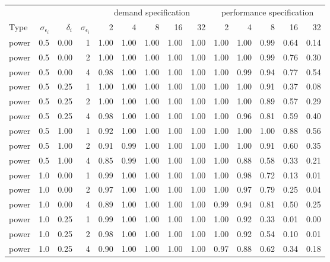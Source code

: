 \begin{table}[H]
\centering\begingroup\fontsize{8}{10}\selectfont

\begin{tabular}{lrrrrrrrrrrrrr}
\toprule
\multicolumn{4}{c}{ } & \multicolumn{5}{c}{demand specification} & \multicolumn{5}{c}{performance specification} \\
\cmidrule(l{3pt}r{3pt}){5-9} \cmidrule(l{3pt}r{3pt}){10-14}
Type & $\sigma_{\epsilon_i}$ & $\delta_i$ & $\sigma_{\epsilon_i}$ & 2 & 4 & 8 & 16 & 32 & 2 & 4 & 8 & 16 & 32\\
\midrule
power & 0.5 & 0.00 & 1 & 1.00 & 1.00 & 1.00 & 1.00 & 1.00 & 1.00 & 1.00 & 0.99 & 0.64 & 0.14\\
power & 0.5 & 0.00 & 2 & 1.00 & 1.00 & 1.00 & 1.00 & 1.00 & 1.00 & 1.00 & 0.99 & 0.76 & 0.30\\
power & 0.5 & 0.00 & 4 & 0.98 & 1.00 & 1.00 & 1.00 & 1.00 & 1.00 & 0.99 & 0.94 & 0.77 & 0.54\\
power & 0.5 & 0.25 & 1 & 1.00 & 1.00 & 1.00 & 1.00 & 1.00 & 1.00 & 1.00 & 0.91 & 0.37 & 0.08\\
power & 0.5 & 0.25 & 2 & 1.00 & 1.00 & 1.00 & 1.00 & 1.00 & 1.00 & 1.00 & 0.89 & 0.57 & 0.29\\
power & 0.5 & 0.25 & 4 & 0.98 & 1.00 & 1.00 & 1.00 & 1.00 & 1.00 & 0.96 & 0.81 & 0.59 & 0.40\\
power & 0.5 & 1.00 & 1 & 0.92 & 1.00 & 1.00 & 1.00 & 1.00 & 1.00 & 1.00 & 1.00 & 0.88 & 0.56\\
power & 0.5 & 1.00 & 2 & 0.91 & 0.99 & 1.00 & 1.00 & 1.00 & 1.00 & 1.00 & 0.91 & 0.60 & 0.35\\
power & 0.5 & 1.00 & 4 & 0.85 & 0.99 & 1.00 & 1.00 & 1.00 & 1.00 & 0.88 & 0.58 & 0.33 & 0.21\\
power & 1.0 & 0.00 & 1 & 0.99 & 1.00 & 1.00 & 1.00 & 1.00 & 1.00 & 0.98 & 0.72 & 0.13 & 0.01\\
power & 1.0 & 0.00 & 2 & 0.97 & 1.00 & 1.00 & 1.00 & 1.00 & 1.00 & 0.97 & 0.79 & 0.25 & 0.04\\
power & 1.0 & 0.00 & 4 & 0.89 & 1.00 & 1.00 & 1.00 & 1.00 & 0.99 & 0.94 & 0.81 & 0.50 & 0.25\\
power & 1.0 & 0.25 & 1 & 0.99 & 1.00 & 1.00 & 1.00 & 1.00 & 1.00 & 0.92 & 0.33 & 0.01 & 0.00\\
power & 1.0 & 0.25 & 2 & 0.98 & 1.00 & 1.00 & 1.00 & 1.00 & 1.00 & 0.92 & 0.54 & 0.10 & 0.01\\
power & 1.0 & 0.25 & 4 & 0.90 & 1.00 & 1.00 & 1.00 & 1.00 & 0.97 & 0.88 & 0.62 & 0.34 & 0.18\\

\end{tabular}
\end{table}
